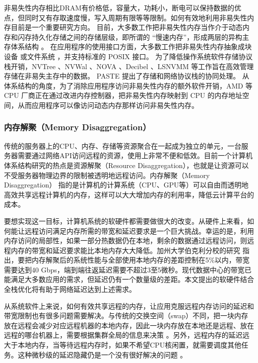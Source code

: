 非易失性内存相比DRAM有价格低，容量大，功耗小，断电可以保持数据的优点，但同时又有存取速度慢，写入周期有限等等限制。如何有效地利用非易失性内存目前是一个重要研究方向。
目前，大多数工作把非易失性内存当作介于动态内存和闪存持久化存储之间的存储层级，即所谓的 ``慢速内存''，形成两层的异构主存体系结构 \cite{dulloor2016data,agarwal2017thermostat}。
在应用程序的使用接口方面，大多数工作把非易失性内存抽象成块设备 \cite{bailey2011operating,huang2014nvram,kim2016nvwal,mogul2009operating,nanavati2017decibel,hu2017log} 或文件系统 \cite{condit2009better,yang2015nv,xu2016nova}，并支持标准的 POSIX 接口。
为了降低操作系统软件存储协议栈开销，NVTree \cite{yang2015nv}、NVWal \cite{kim2016nvwal}、NOVA \cite{xu2016nova}、Decibel \cite{nanavati2017decibel}、LSNVMM \cite{hu2017log} 等工作旨在高效管理存储在非易失主存中的数据。
PASTE \cite{honda2018paste} 提出了存储和网络协议栈的协同处理。
从体系结构的角度，为了消除应用程序访问非易失性内存的额外软件开销，AMD 等 CPU 厂商正在通过改进内存控制器，把非易失性内存映射到 CPU 的内存地址空间，从而应用程序可以像访问动态内存那样访问非易失性内存。


\subsubsection{内存解聚（Memory Disaggregation）}

传统的服务器上的CPU、内存、存储等资源聚合在一起成为独立的单元，一台服务器需要通过网络API访问远程的资源，使用上非常不便和低效。目前一个计算机体系结构研究的热点是资源解聚（Resource Disaggregation），也就是让资源可以不受服务器物理边界的限制被透明地远程访问。内存解聚（Memory Disaggregation） \cite{lim2009disaggregated,han2013network} 指的是计算机的计算系统（CPU、GPU等）可以自由而透明地高效共享远程计算机的内存，这样可以大大增加内存的利用率，降低云计算平台的成本。

要想实现这一目标，计算机系统的软硬件都需要做很大的改变。从硬件上来看，如何能让远程访问满足内存所需的带宽和延迟要求是一个巨大挑战。幸运的是，利用内存访问的局部性，如果一部分热数据仍在本地，剩余的数据通过远程访问，则远程内存的带宽和延迟要求能比本地内存大大降低。加州大学伯克利分校的研究 \cite{gao2016network} 指出，要把内存解聚后的系统性能与全部使用本地内存的差距控制在5\%以内，带宽需要达到40 Gbps，端到端往返延迟需要不超过3至5微秒。现代数据中心的带宽已能满足大多数应用的需求，但延迟仍有一个数量级的差距。本文提出的软硬件结合全栈优化将有助于网络延迟达到上述需求。

从系统软件上来说，如何有效共享远程的内存，让应用克服远程内存访问的延迟和带宽限制也有很多问题需要解决。与传统的交换空间（swap）不同，把一块内存放在远程会减少对应远程机器的本地内存，因此一块内存放在本地还是远程、放在远程的哪台机器上，需要根据集群全局的信息来决策 \cite{gu2017efficient}。另外，远程内存的延迟远大于本地内存，当等待远程内存时，如果不希望CPU核闲置，就需要调度其他任务。这种微秒级的延迟隐藏仍是一个没有很好解决的问题 \cite{barroso2017attack}。

